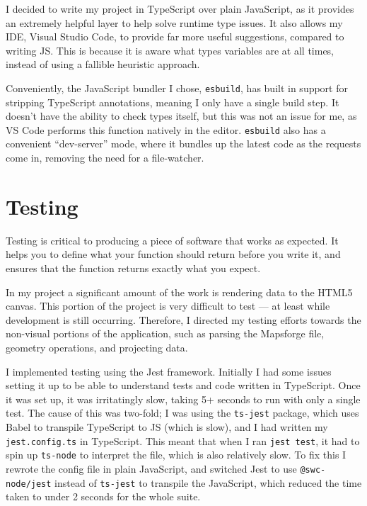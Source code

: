 \documentclass{final_report}
\begin{document}
I decided to write my project in TypeScript over plain JavaScript, as it provides an extremely helpful layer to help solve runtime type issues. It also allows my IDE, Visual Studio Code, to provide far more useful suggestions, compared to writing JS\@. This is because it is aware what types variables are at all times, instead of using a fallible heuristic approach.

Conveniently, the JavaScript bundler I chose, \texttt{esbuild}, has built in support for stripping TypeScript annotations, meaning I only have a single build step. It doesn't have the ability to check types itself, but this was not an issue for me, as VS Code performs this function natively in the editor. \texttt{esbuild} also has a convenient ``dev-server'' mode, where it bundles up the latest code as the requests come in, removing the need for a file-watcher.

\section{Testing}

Testing is critical to producing a piece of software that works as expected. It helps you to define what your function should return before you write it, and ensures that the function returns exactly what you expect.

In my project a significant amount of the work is rendering data to the HTML5 canvas. This portion of the project is very difficult to test --- at least while development is still occurring. Therefore, I directed my testing efforts towards the non-visual portions of the application, such as parsing the Mapsforge file, geometry operations, and projecting data.

I implemented testing using the Jest framework. Initially I had some issues setting it up to be able to understand tests and code written in TypeScript. Once it was set up, it was irritatingly slow, taking 5+ seconds to run with only a single test. The cause of this was two-fold; I was using the \texttt{ts-jest} package, which uses Babel to transpile TypeScript to JS (which is slow), and I had written my \texttt{jest.config.ts} in TypeScript. This meant that when I ran \texttt{jest test}, it had to spin up \texttt{ts-node} to interpret the file, which is also relatively slow. To fix this I rewrote the config file in plain JavaScript, and switched Jest to use \texttt{@swc-node/jest} instead of \texttt{ts-jest} to transpile the JavaScript, which reduced the time taken to under 2 seconds for the whole suite.
\end{document}
